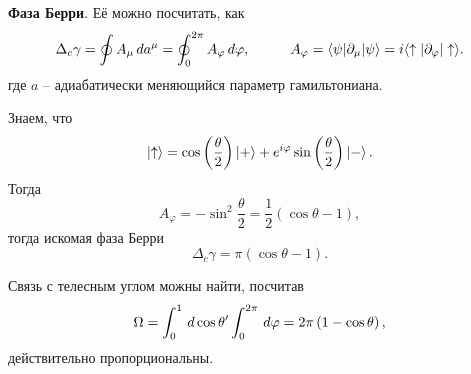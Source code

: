 \textbf{Фаза Берри}. Её можно посчитать, как
\begin{equation*}
    \Delta_c \gamma = \oint A_\mu \d a^\mu = \oint_0^{2 \pi} A_\varphi \d \varphi,
    \hspace{10 mm} 
    A_\varphi = \bk{\psi}[\partial_\mu]{\psi}= i \bk{\uparrow}[\partial_\varphi]{\uparrow}.
\end{equation*}
где $a$ -- адиабатически меняющийся параметр гамильтониана. 

Знаем, что
\begin{equation*}
    \left| \uparrow \right\rangle = \cos\left(\frac{\theta}{2}\right) \left| + \right\rangle + e^{i \varphi} \sin\left(\frac{\theta}{2}\right) \left| - \right\rangle.
\end{equation*}
Тогда
\begin{equation*}
    A_\varphi = -\sin^2 \frac{\theta}{2} = \frac{1}{2} \left(\cos \theta -1\right),
\end{equation*}
тогда искомая фаза Берри
\begin{equation*}
    \Delta_c \gamma = \pi \left(\cos \theta - 1\right).
\end{equation*}

Связь с телесным углом можны найти, посчитав
\begin{equation*}
    \Omega = \int_{0}^{1} \, d \cos \theta' \int_{0}^{2\pi} \, d \varphi = 2 \pi \left(1 - \cos \theta\right),
\end{equation*}
действительно пропорциональны.

